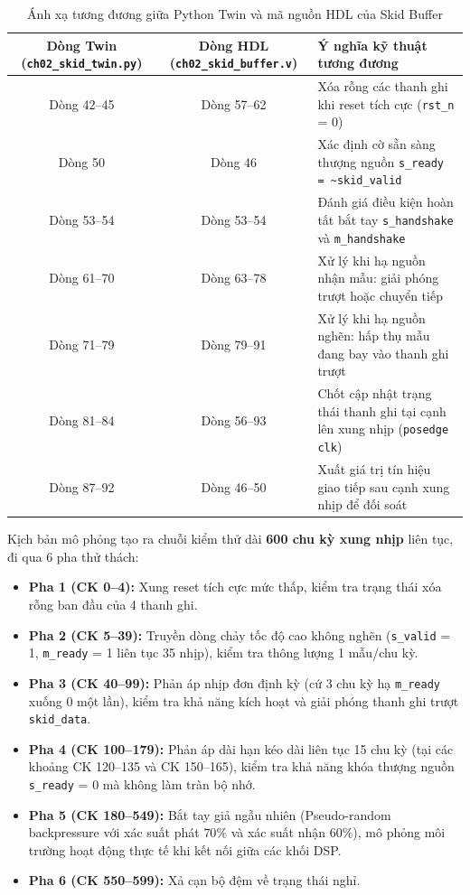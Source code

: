 \begin{table}[htbp]
\centering
\footnotesize
\caption{Ánh xạ tương đương giữa Python Twin và mã nguồn HDL của Skid Buffer}
\label{tab:ch02_skid_mapping}
\begin{tabularx}{\textwidth}{ccX}
\toprule
Dòng Twin (\texttt{ch02\_skid\_twin.py}) & Dòng HDL (\texttt{ch02\_skid\_buffer.v}) & Ý nghĩa kỹ thuật tương đương \\
\midrule
Dòng 42--45 & Dòng 57--62 & Xóa rỗng các thanh ghi khi reset tích cực (\texttt{rst\_n} = 0) \\
Dòng 50 & Dòng 46 & Xác định cờ sẵn sàng thượng nguồn \texttt{s\_ready = \~{}skid\_valid} \\
Dòng 53--54 & Dòng 53--54 & Đánh giá điều kiện hoàn tất bắt tay \texttt{s\_handshake} và \texttt{m\_handshake} \\
Dòng 61--70 & Dòng 63--78 & Xử lý khi hạ nguồn nhận mẫu: giải phóng trượt hoặc chuyển tiếp \\
Dòng 71--79 & Dòng 79--91 & Xử lý khi hạ nguồn nghẽn: hấp thụ mẫu đang bay vào thanh ghi trượt \\
Dòng 81--84 & Dòng 56--93 & Chốt cập nhật trạng thái thanh ghi tại cạnh lên xung nhịp (\texttt{posedge clk}) \\
Dòng 87--92 & Dòng 46--50 & Xuất giá trị tín hiệu giao tiếp sau cạnh xung nhịp để đối soát \\
\bottomrule
\end{tabularx}
\end{table}

Kịch bản mô phỏng tạo ra chuỗi kiểm thử dài \textbf{600 chu kỳ xung nhịp} liên tục, đi qua 6 pha thử thách:
\begin{itemize}[leftmargin=1.5em, itemsep=2pt]
    \item \textbf{Pha 1 (CK 0--4):} Xung reset tích cực mức thấp, kiểm tra trạng thái xóa rỗng ban đầu của 4 thanh ghi.
    \item \textbf{Pha 2 (CK 5--39):} Truyền dòng chảy tốc độ cao không nghẽn (\texttt{s\_valid} = 1, \texttt{m\_ready} = 1 liên tục 35 nhịp), kiểm tra thông lượng 1 mẫu/chu kỳ.
    \item \textbf{Pha 3 (CK 40--99):} Phản áp nhịp đơn định kỳ (cứ 3 chu kỳ hạ \texttt{m\_ready} xuống 0 một lần), kiểm tra khả năng kích hoạt và giải phóng thanh ghi trượt \texttt{skid\_data}.
    \item \textbf{Pha 4 (CK 100--179):} Phản áp dài hạn kéo dài liên tục 15 chu kỳ (tại các khoảng CK 120--135 và CK 150--165), kiểm tra khả năng khóa thượng nguồn \texttt{s\_ready} = 0 mà không làm tràn bộ nhớ.
    \item \textbf{Pha 5 (CK 180--549):} Bắt tay giả ngẫu nhiên (Pseudo-random backpressure với xác suất phát $70\%$ và xác suất nhận $60\%$), mô phỏng môi trường hoạt động thực tế khi kết nối giữa các khối DSP.
    \item \textbf{Pha 6 (CK 550--599):} Xả cạn bộ đệm về trạng thái nghỉ.
\end{itemize}

